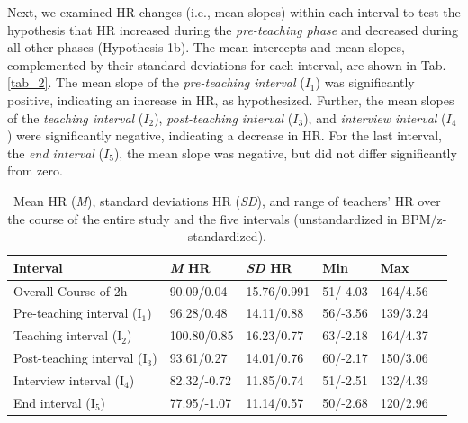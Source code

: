 \documentclass[preprint,
3p]{elsarticle} %
\begin{document}
Next, we examined HR changes (i.e., mean slopes) within each interval to
test the hypothesis that HR increased during the \emph{pre-teaching
phase} and decreased during all other phases (Hypothesis 1b). The mean
intercepts and mean slopes, complemented by their standard deviations
for each interval, are shown in Tab.\ref{tab_2}. The mean slope of the
\emph{pre-teaching interval} (\(I_1\)) was significantly positive,
indicating an increase in HR, as hypothesized. Further, the mean slopes
of the \emph{teaching interval} (\(I_2\)), \emph{post-teaching interval}
(\(I_3\)), and \emph{interview interval} (\(I_4\)) were significantly
negative, indicating a decrease in HR. For the last interval, the
\emph{end interval} (\(I_5\)), the mean slope was negative, but did not
differ significantly from zero.

\renewcommand{\arraystretch}{1.5}

\begin{table}[ht]
    \centering
    \begin{tabularx}{\textwidth}{lXXXXX}
        \toprule
        Interval & \textit{M} HR & \textit{SD} HR & Min & Max \\
        \midrule
        Overall Course of 2h & 90.09/0.04\footnotemark[12] & 15.76/0.991 & 51/-4.03 & 164/4.56 \\
        Pre-teaching interval (I$_1$) & 96.28/0.48 & 14.11/0.88 & 56/-3.56 & 139/3.24 \\
        Teaching interval (I$_2$) & 100.80/0.85 & 16.23/0.77 & 63/-2.18 & 164/4.37 \\
        Post-teaching interval (I$_3$) & 93.61/0.27 & 14.01/0.76 & 60/-2.17 & 150/3.06 \\
        Interview interval (I$_4$) & 82.32/-0.72 & 11.85/0.74 & 51/-2.51 & 132/4.39 \\
        End interval (I$_5$) & 77.95/-1.07 & 11.14/0.57 & 50\footnotemark[13]/-2.68 & 120/2.96 \\
        \bottomrule
    \end{tabularx}
    \caption{Mean HR (\textit{M}), standard deviations HR (\textit{SD}), and range of teachers’ HR over the course of the entire study and the five intervals (unstandardized in BPM/z-standardized).}
    \label{tab_1}

    
\end{table}
\end{document}

